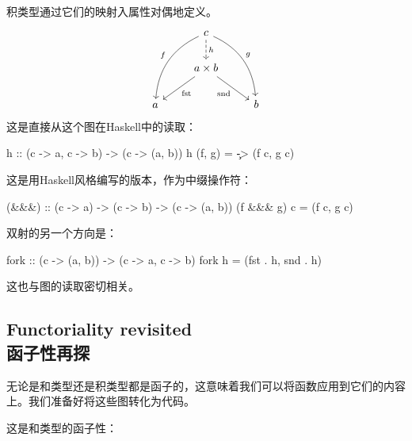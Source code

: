 \documentclass[DaoFP]{subfiles}
\begin{document}
积类型通过它们的映射入属性对偶地定义。
\[
\begin{tikzcd}
& c
\arrow[d, dashed, "h"]
\arrow[ddl, bend right, "f"']
\arrow[ddr, bend left, "g"]
\\
&a \times b
\arrow[dl,  "\text{fst}"]
\arrow[dr,   "\text{snd}"']
\\
a && b
\end{tikzcd}
\]
这是直接从这个图在Haskell中的读取：
\begin{haskell}
h :: (c -> a, c -> b) -> (c -> (a, b))
h (f, g) = \c -> (f c, g c)
\end{haskell}
这是用Haskell风格编写的版本，作为中缀操作符\hask{&&&}：
\begin{haskell}
(&&&) :: (c -> a) -> (c -> b) -> (c -> (a, b))
(f &&& g) c = (f c, g c)
\end{haskell}
双射的另一个方向是：
\begin{haskell}
fork :: (c -> (a, b)) -> (c -> a, c -> b)
fork h = (fst . h, snd . h)
\end{haskell}
这也与图的读取密切相关。

\subsection{Functoriality revisited\\函子性再探}

无论是和类型还是积类型都是函子的，这意味着我们可以将函数应用到它们的内容上。我们准备好将这些图转化为代码。

这是和类型的函子性：
\end{document}
